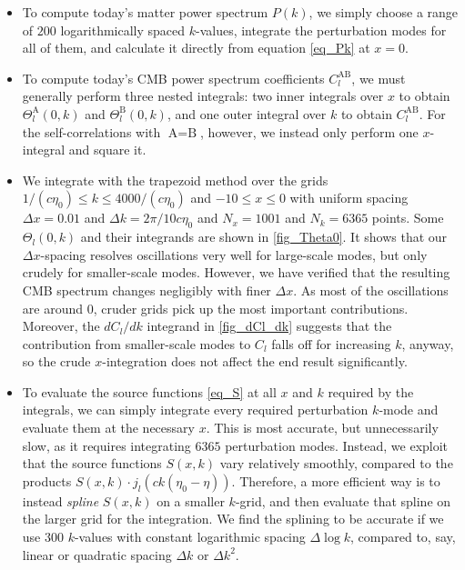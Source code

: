 \documentclass[10pt,a4paper]{article}
\begin{document}
\begin{itemize}
\item
To compute today's matter power spectrum $P(k)$,
we simply choose a range of $200$ logarithmically spaced $k$-values,
integrate the perturbation modes for all of them,
and calculate it directly from equation \eqref{eq_Pk} at $x=0$.

\item
To compute today's CMB power spectrum coefficients $C_l^\text{AB}$,
we must generally perform three nested integrals:
two inner integrals over $x$ to obtain $\Theta_l^\text{A}(0,k)$ and $\Theta_l^\text{B}(0,k)$,
and one outer integral over $k$ to obtain $C_l^\text{AB}$.
For the self-correlations with $\text{A}=\text{B}$, however,
we instead only perform one $x$-integral and square it.

\item
We integrate with the trapezoid method over the grids
$1/(c\eta_0) \leq k \leq 4000/(c\eta_0)$ and $-10 \leq x \leq 0$
with uniform spacing $\Delta x = 0.01$ and $\Delta k = 2 \pi / 10 c \eta_0$
and $N_x = 1001$ and $N_k = 6365$ points.
Some $\Theta_l(0,k)$ and their integrands are shown in \cref{fig_Theta0}.
It shows that our $\Delta x$-spacing resolves oscillations very well for large-scale modes,
but only crudely for smaller-scale modes.
However, we have verified that the resulting CMB spectrum changes negligibly with finer $\Delta x$.
As most of the oscillations are around $0$, cruder grids pick up the most important contributions.
Moreover, the $d C_l/dk$ integrand in \cref{fig_dCl_dk} suggests that
the contribution from smaller-scale modes to $C_l$ falls off for increasing $k$, anyway,
so the crude $x$-integration does not affect the end result significantly.

\item
To evaluate the source functions \eqref{eq_S} at all $x$ and $k$ required by the integrals,
we can simply integrate every required perturbation $k$-mode and evaluate them at the necessary $x$.
This is most accurate, but unnecessarily slow, as it requires integrating $6365$ perturbation modes.
Instead, we exploit that
the source functions $S(x,k)$ vary relatively smoothly,
compared to the products $S(x,k) \cdot j_l(ck(\eta_0-\eta))$.
Therefore, a more efficient way is to instead \emph{spline} $S(x,k)$ on a smaller $k$-grid,
and then evaluate that spline on the larger grid for the integration.
We find the splining to be accurate if we use $300$ $k$-values with constant logarithmic spacing $\Delta \log k$,
compared to, say, linear or quadratic spacing $\Delta k$ or $\Delta k^2$.


\end{itemize}
\end{document}
